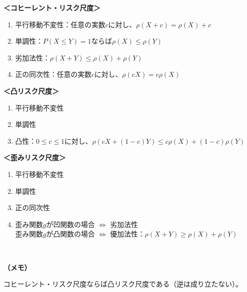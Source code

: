 \begin{sol}
$ $

\textbf{＜コヒーレント・リスク尺度＞}
\begin{enumerate}
  \item 平行移動不変性：任意の実数$c$に対し、$\rho(X+c) = \rho(X) + c$
  \item 単調性：$P(X \leq Y ) = 1$ならば$\rho(X) \leq \rho(Y)$
  \item 劣加法性：$\rho(X+Y) \leq \rho(X) + \rho(Y)$
  \item 正の同次性：任意の実数$c$に対し、$\rho(cX) = c\rho(X) $
\end{enumerate}

\textbf{＜凸リスク尺度＞}
\begin{enumerate}
  \item 平行移動不変性
  \item 単調性
  \item 凸性：$0 \leq c \leq 1$に対し、$\rho(c X + (1-c)Y) \leq c\rho(X) + (1-c) \rho(Y)$
\end{enumerate}

\textbf{＜歪みリスク尺度＞}
\begin{enumerate}
  \item 平行移動不変性
  \item 単調性
  \item 正の同次性
  \item 歪み関数$g$が凹関数の場合 $\iff$ 劣加法性 \\
  歪み関数$g$が凸関数の場合 $\iff$ 優加法性：$\rho(X+Y) \geq \rho(X) + \rho(Y)$
\end{enumerate}


\end{sol}

\


\textbf{（メモ）}

コヒーレント・リスク尺度ならば凸リスク尺度である（逆は成り立たない）。

